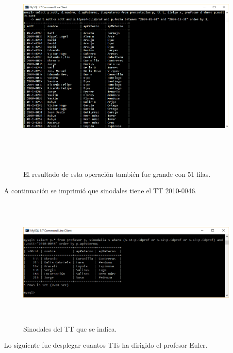 \documentclass[12pt, titlepage]{article}
\begin{document}
	\begin{figure}[H]
		\begin{center}
			\includegraphics[width=16cm, height=11cm]{img/siete.png}
			\caption{El resultado de esta operación también fue grande con 51 filas.} 
			\label{fig:ejercicio8}
		\end{center}
	\end{figure}
	A continuación se imprimió que sinodales tiene el TT 2010-0046.
	\begin{figure}[H]
		\begin{center}
			\includegraphics[width=16cm, height=6.5cm]{img/ocho.png}
			\caption{Sinodales del TT que se indica.} 
			\label{fig:ejercicio9}
		\end{center}
	\end{figure}
	Lo siguiente fue desplegar cuantos TTs ha dirigido el profesor Euler.
\end{document}
